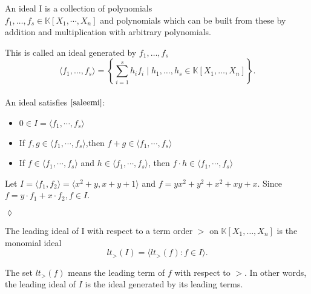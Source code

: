 \begin{env_definition}[Ideal]
\cite{KHZ}
An ideal I is a collection of polynomials \\ $f_{1},\dots ,f_{s} \in \mathbb{K}\left[X_{1}, \cdots, X_{n}\right] $ and polynomials which can be built from these by addition and multiplication with arbitrary polynomials.

\end{env_definition}
This is called an ideal generated by $f_{1}, \dots , f_{s}$ \\
\[ \langle f_{1}, \dots , f_{s} \rangle = \left\lbrace  \sum_{i=1}^s h_{i}f_{i} \mid h_{1}, \dots , h_{s} \in \mathbb{K}\left[X_{1}, \dots, X_{n}\right] \right\rbrace. \]
\\
An ideal satisfies $\cite{saleemi} $:
\begin{center}

\begin{itemize}
\item
$0 \in I = \langle f_{1}, \cdots , f_{s} \rangle$ 
\item
If $f,g \in \langle f_{1}, \cdots , f_{s} \rangle$,then  $f+g \in \langle f_{1}, \cdots , f_{s} \rangle$ 
\item
If $f \in \langle f_{1}, \cdots , f_{s} \rangle$ and $h \in  \langle f_{1}, \cdots , f_{s} \rangle$, then $f \cdot h \in \langle f_{1}, \cdots , f_{s} \rangle$
\end{itemize}

\end{center}


\begin{env_example}\normalfont
Let $ I= \langle f_{1},f_{2} \rangle = \langle x^{2}+y, x+y+1 \rangle $ and $f=yx^{2}+y^{2}+x^{2}+xy+x$. Since $f= y \cdot f_{1} + x \cdot f_{2}, f\in I$.
\begin{flushright}
$\lozenge$
\end{flushright} 
\end{env_example}


\begin{env_definition}
\label{def:initial}
\cite{tigers} The leading ideal of I with respect to a term order $>$ on $\mathbb{K}\left[X_{1}, \dots, X_{n}\right]$ is the monomial ideal \\
\[lt_{>}(I) = \langle lt_{>}(f) : f \in I  \rangle . \]

\end{env_definition}
The set $lt_{>}(f)$ means the leading term of $f$ with respect to $>$. In other words, the leading ideal of $I$ is the ideal generated by its leading terms.

